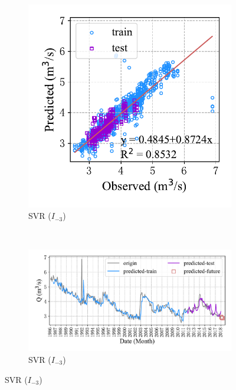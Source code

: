 \begin{figure}[!htbp]
  \\
  \begin{subfigure}[b]{0.305\textwidth}
    \includegraphics[width=\textwidth]{Img/chap4_spr/spr_scatter_in_3_out_4_svr.pdf}
    \vspace{-1.2cm}
    \caption{SVR ($I_{-3}$)}
    \label{fig:spr_scatter_in_3_out_4_svr}
  \end{subfigure}
  ~
  \begin{subfigure}[b]{0.615\textwidth}
    \includegraphics[width=\textwidth]{Img/chap4_spr/spr_series_in_3_out_4_svr.pdf}
    \vspace{-1.2cm}
    \caption{SVR ($I_{-3}$)}
    \label{fig:spr_series_in_3_out_4_svr}
  \end{subfigure}

\end{figure}
